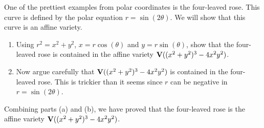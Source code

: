 \begin{exercise}{7}
One of the prettiest examples from polar coordinates is the four-leaved rose. 
This curve is defined by the polar equation $r=\sin(2\theta)$. 
We will show that this curve is an affine variety.
\begin{enumerate}
    \item Using $r^2 = x^2 + y^2$, $x=r\cos(\theta)$ and $y=r\sin(\theta)$, show that the four-leaved rose is contained in the affine variety $\mathbf{V}( (x^2 + y^2)^3 - 4x^2 y^2)$.
    \item Now argue carefully that $\mathbf{V}((x^2 + y^2)^3 - 4x^2 y^2)$ is contained in the four-leaved rose. 
    This is trickier than it seems since $r$ can be negative in $r=\sin(2\theta)$.
\end{enumerate}
Combining parts (a) and (b), we have proved that the four-leaved rose is the affine variety $\mathbf{V}((x^2 + y^2)^3 - 4x^2 y^2)$.
\end{exercise}
